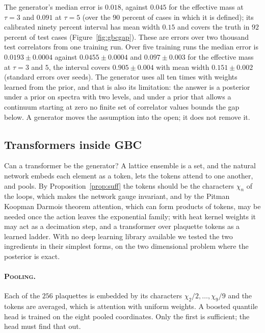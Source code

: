The generator's median error is $0.018$, against $0.045$ for the effective mass at $\tau=3$ and $0.091$ at $\tau=5$ (over the $90$ percent of cases in which it is defined); its calibrated ninety percent interval has mean width $0.15$ and covers the truth in $92$ percent of test cases (Figure~\ref{fig:gbcgap}). These are errors over two thousand test correlators from one training run. Over five training runs the median error is $0.0193\pm0.0004$ against $0.0455\pm0.0004$ and $0.097\pm0.003$ for the effective mass at $\tau=3$ and $5$, the interval covers $0.905\pm0.004$ with mean width $0.151\pm0.002$ (standard errors over seeds). The generator uses all ten times with weights learned from the prior, and that is also its limitation: the answer is a posterior under a prior on spectra with two levels, and under a prior that allows a continuum starting at zero no finite set of correlator values bounds the gap below. A generator moves the assumption into the open; it does not remove it.

\subsection{Transformers inside GBC}

Can a transformer be the generator? A lattice ensemble is a set, and the natural network embeds each element as a token, lets the tokens attend to one another, and pools. By Proposition~\ref{prop:suff} the tokens should be the characters $\chi_n$ of the loops, which makes the network gauge invariant, and by the Pitman Koopman Darmois theorem attention, which can form products of tokens, may be needed once the action leaves the exponential family; with heat kernel weights it may act as a decimation step, and a transformer over plaquette tokens as a learned ladder. With no deep learning library available we tested the two ingredients in their simplest forms, on the two dimensional problem where the posterior is exact.

\paragraph{\normalfont\scshape Pooling.} Each of the $256$ plaquettes is embedded by its characters $\chi_2/2,\dots,\chi_9/9$ and the tokens are averaged, which is attention with uniform weights. A boosted quantile head is trained on the eight pooled coordinates. Only the first is sufficient; the head must find that out.

